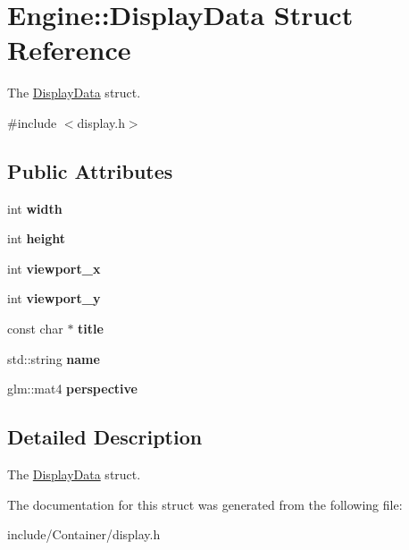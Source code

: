 \hypertarget{structEngine_1_1DisplayData}{}\section{Engine\+:\+:Display\+Data Struct Reference}
\label{structEngine_1_1DisplayData}


The \hyperlink{structEngine_1_1DisplayData}{Display\+Data} struct.  




{\ttfamily \#include $<$display.\+h$>$}

\subsection*{Public Attributes}
\begin{DoxyCompactItemize}
\item 
\hypertarget{structEngine_1_1DisplayData_a576186911802decb15a7f73fb80a760f}{}int {\bfseries width}\label{structEngine_1_1DisplayData_a576186911802decb15a7f73fb80a760f}

\item 
\hypertarget{structEngine_1_1DisplayData_a8be5c86e7a59c5213f80d725531201ae}{}int {\bfseries height}\label{structEngine_1_1DisplayData_a8be5c86e7a59c5213f80d725531201ae}

\item 
\hypertarget{structEngine_1_1DisplayData_a90c689d6b5664922ca78045a34392164}{}int {\bfseries viewport\+\_\+x}\label{structEngine_1_1DisplayData_a90c689d6b5664922ca78045a34392164}

\item 
\hypertarget{structEngine_1_1DisplayData_abd6b90c1e0388736978e9c52d146d64b}{}int {\bfseries viewport\+\_\+y}\label{structEngine_1_1DisplayData_abd6b90c1e0388736978e9c52d146d64b}

\item 
\hypertarget{structEngine_1_1DisplayData_afd11e145d90e7d2c2b9b2bc25dc8e327}{}const char $\ast$ {\bfseries title}\label{structEngine_1_1DisplayData_afd11e145d90e7d2c2b9b2bc25dc8e327}

\item 
\hypertarget{structEngine_1_1DisplayData_a74c2d2098859902e1c09de3c26cbc2aa}{}std\+::string {\bfseries name}\label{structEngine_1_1DisplayData_a74c2d2098859902e1c09de3c26cbc2aa}

\item 
\hypertarget{structEngine_1_1DisplayData_a3aa8443a4b2aab960c6ce44413a9ebd4}{}glm\+::mat4 {\bfseries perspective}\label{structEngine_1_1DisplayData_a3aa8443a4b2aab960c6ce44413a9ebd4}

\end{DoxyCompactItemize}


\subsection{Detailed Description}
The \hyperlink{structEngine_1_1DisplayData}{Display\+Data} struct. 

The documentation for this struct was generated from the following file\+:\begin{DoxyCompactItemize}
\item 
include/\+Container/display.\+h\end{DoxyCompactItemize}
